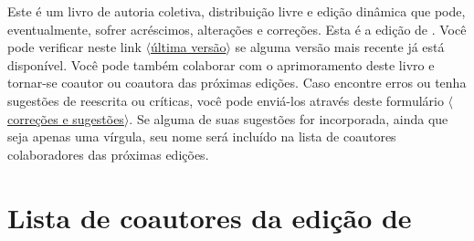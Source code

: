 \parbox{3 in}{

Este é um livro de autoria coletiva, distribuição livre e edição dinâmica que pode, eventualmente, sofrer acréscimos, alterações e correções.
Esta é a edição de \mydate.
Você pode verificar neste link
\href{https://github.com/Grupo-de-Estudos-em-Logica-da-UFRN/Para-Todxs-Natal/blob/main/paratodxsnatal.pdf}{$\langle$última versão$\rangle$}
se alguma versão mais recente já está disponível.
Você pode também colaborar com o aprimoramento deste livro e tornar-se coautor ou coautora das próximas edições.
Caso encontre erros ou tenha sugestões de reescrita ou críticas, você pode enviá-los através deste formulário 
\href{https://forms.gle/yd4yH9WAo6TxAiSj8}{$\langle$correções e sugestões$\rangle$}.
Se alguma de suas sugestões for incorporada, ainda que seja apenas uma vírgula, seu nome será incluído na lista de coautores colaboradores das próximas edições. 

}

\newpage

\section{Lista de coautores da edição de \ \mydate}

